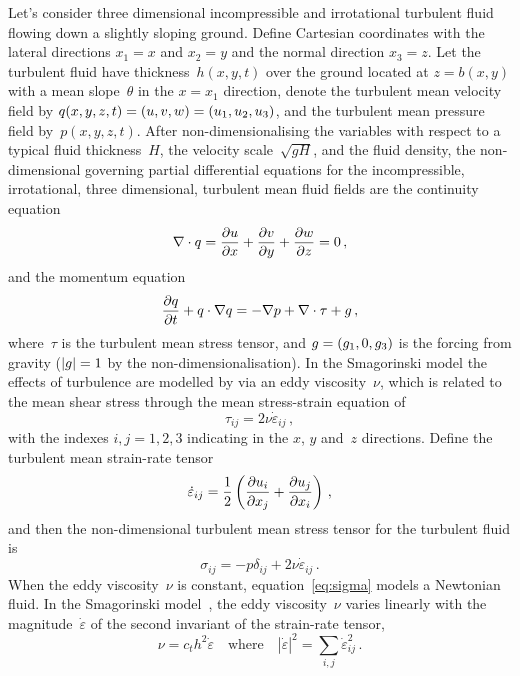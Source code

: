 \documentclass[a5paper,12pt]{article}
\newcommand{\ros}{{\dot\varepsilon}}
\renewcommand{\vec}[1]{\text{\boldmath$#1$}}
\begin{document}
Let's consider three dimensional incompressible and irrotational turbulent fluid flowing down a slightly sloping ground. 
Define Cartesian coordinates with the lateral directions $x_1=x$ and $x_2=y$ and the normal direction $x_3=z$. 
Let the turbulent fluid have thickness~$h(x,y,t)$ over the ground located at $z=b(x,y)$ with a mean slope~$\theta$ in the $x=x_1$ direction, denote the turbulent mean velocity field by $\vec q(x,y,z,t)=(u,v,w)=(u_1,u_2,u_3)$, and the turbulent mean pressure field by~$p(x,y,z,t)$.
After non-dimensionalising the variables with respect to a typical fluid thickness~$H$, the velocity scale~$\sqrt{gH}$, and the  fluid density, the non-dimensional governing partial differential equations for the incompressible, irrotational, three dimensional, turbulent mean fluid fields are the continuity equation
\begin{equation}
    \divv\vec q=\D xu+\D yv+\D zw=0\,,\label{eq:cont}
\end{equation}
and the momentum equation
\begin{equation}
    \D t{\vec q} +\vec q\cdot\grad\vec q
    =-\grad p +\divv\tau +\vec{g}\,,\label{eq:mom}
\end{equation}
where~$\tau$ is the turbulent mean stress tensor, and $\vec g=(g_1,0,g_3)$ is the forcing from gravity ($|\vec g|=1$ by the non-dimensionalisation).
In the Smagorinski model the effects of turbulence are modelled by via an eddy viscosity~$\nu$, which is related to the mean shear stress through the mean stress-strain equation of
\begin{equation}
\tau_{ij}=2\nu\ros_{ij}\,,\label{eq:tau}
\end{equation}
with the indexes $i,j=1,2,3$ indicating in the $x$, $y$ and~$z$ directions.
Define the turbulent mean strain-rate tensor~\cite[e.g.]{Roberts2008,Georgiev2008}
\begin{equation}
	\ros_{ij} =\frac12\left( \D{x_j}{u_i} +\D{x_i}{u_j}\right) \,,\label{eq:strainrate}
\end{equation}
and then the non-dimensional turbulent mean stress tensor for the turbulent fluid is
\begin{equation}
\sigma_{ij}=-p\delta_{ij}+2\nu\ros_{ij}\,.\label{eq:sigma}
\end{equation}
When the eddy viscosity~$\nu$ is constant, equation~\eqref{eq:sigma} models a Newtonian fluid.
In the Smagorinski model~\cite[e.g.]{Ozgokmen2007a}, the eddy viscosity~$\nu$ varies linearly with the magnitude~$\ros$ of the second invariant of the strain-rate tensor,
\begin{equation}
  \nu=c_th^2\ros\quad\text{where}\quad |\ros|^2=\sum_{i,j}\ros_{ij}^2\,.\label{eq:nu}
\end{equation}
\end{document}
